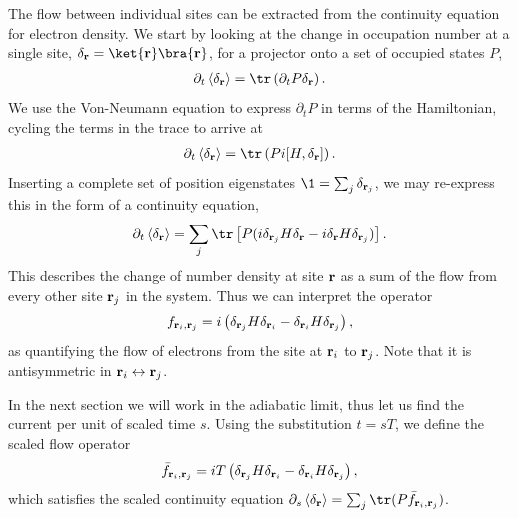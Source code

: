The flow between individual sites can be extracted from the continuity equation for electron density. We start by looking at the change in occupation number at a single site, $\delta_{\textbf r} = \ket {\textbf r} \bra{\textbf r}$, for a projector onto a set of occupied states $P$,
\begin{align}
    \partial_t \left \langle \delta_{\textbf r} \right \rangle = \tr \left (
    \partial_t P \delta_{\textbf r} 
    \right ).
\end{align}
We use the Von-Neumann equation to express $\partial_t P$ in terms of the Hamiltonian, cycling the terms in the trace to arrive at
\begin{align}
    \partial_t \left \langle \delta_{\textbf r }\right \rangle = \tr \left (P i [H,\delta_{\textbf r}]\right ).
\end{align}
Inserting a complete set of position eigenstates $\1 = \sum_{j} \delta_{\textbf r_j}$, we may re-express this in the form of a continuity equation,
\begin{align}\label{eqn:continuity_eqn}
    \partial_t \left \langle \delta_{\textbf r }\right \rangle = 
    \sum_{j} \tr \left [ P (
    i \delta_{\textbf r_j}H\delta_{ \textbf r }
    -i\delta_{\textbf r}H\delta_{ \textbf r_j }
    )
    \right ].
\end{align}
This describes the change of number density at site $\textbf r$ as a sum of the flow from every other site $\textbf r_j$ in the system. Thus we can interpret the operator 
\begin{align}\label{eqn:two_point_current}
    f_{\textbf r_i,\textbf r_j} = i \left (\delta_{\textbf r_j}H\delta_{\textbf r_i }-\delta_{\textbf r_i}H\delta_{ \textbf r_j }\right ),
\end{align}
as quantifying the flow of electrons from the site at $\textbf r_i$ to $\textbf r_j$. Note that it is antisymmetric in $\textbf r_i \leftrightarrow \textbf r_j$.\par
In the next section we will work in the adiabatic limit, thus let us find the current per unit of scaled time $s$. Using the substitution $t = sT$, we define the scaled flow operator
\begin{align}
    \bar f_{\textbf r_i,\textbf r_j} = iT \left (\delta_{\textbf r_j}H\delta_{\textbf r_i }-\delta_{\textbf r_i}H\delta_{ \textbf r_j }\right ),
\end{align}
which satisfies the scaled continuity equation $\partial_s \left \langle \delta_{\textbf r} \right \rangle = \sum_j \tr (P \bar f_{\textbf r_i,\textbf r_j})$.\par
